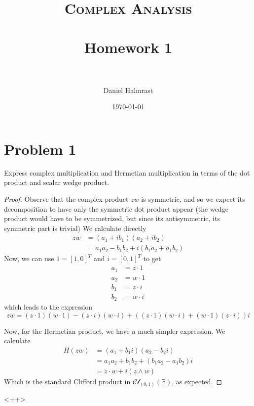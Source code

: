 \documentclass[fontsize=11pt]{scrartcl} %
\title{	
\normalfont \normalsize 
\textsc{Complex Analysis} \\ [25pt] %
\horrule{0.5pt} \\[0.4cm] %
\huge Homework 1 \\ %
\horrule{2pt} \\[0.5cm] %
}
\author{Daniel Halmrast} %
\date{\normalsize\today} %
\numberwithin{equation}{section} %
\numberwithin{figure}{section} %
\numberwithin{table}{section} %
\newcommand{\R}{\mathbb{R}}
\begin{document}
\maketitle %

\section*{Problem 1}
Express complex multiplication and Hermetian multiplication in terms of the dot
product and scalar wedge product.

\begin{proof}
    Observe that the complex product $zw$ is symmetric, and so we expect its
    decomposition to have only the symmetric dot product appear (the wedge
        product would have to be symmetrized, but since its antisymmetric, its
    symmetric part is trivial)
    We calculate directly
    \[
        \begin{aligned}
            zw &= (a_1 + ib_1)(a_2+ib_2)\\
            &= a_1a_2 - b_1b_2 + i(b_1a_2 + a_1b_2)
        \end{aligned}
    \]
    Now, we can use $1 = [1,0]^T$ and $i = [0,1]^T$ to get
    \[
\begin{aligned}
    a_1 &= z\cdot 1\\
    a_2 &= w\cdot 1\\
    b_1 &= z\cdot i\\
    b_2 &= w\cdot i
\end{aligned}
    \]
    which leads to the expression
    \[
    zw = (z\cdot 1)(w\cdot 1) - (z\cdot i)(w\cdot i) + ((z\cdot 1)(w\cdot i) +
    (w\cdot 1)(z\cdot i))i
    \]

    Now, for the Hermetian product, we have a much simpler expression. We
    calculate
    \[
        \begin{aligned}
            H(zw) &= (a_1 + b_1i)(a_2 - b_2i)\\
            &= a_1a_2 + b_1b_2 + (b_1a_2 - a_1b_2)i\\
            &= z\cdot w + i(z\wedge w)
        \end{aligned}
    \]
    Which is the standard Clifford product in $\mathscr{Cl}_{(0,1)}(\R)$, as
    expected.

\end{proof}<++>
\end{document}
